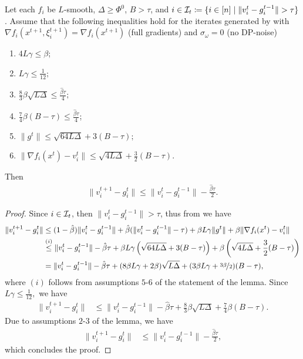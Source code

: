 \documentclass[a4paper,11pt]{article}
\begin{document}
\begin{lemma}\label{lem:bound_gt_vt}
    Let each $f_i$ be $L$-smooth, $\Delta \ge \Phi^0$, $B>\tau$, and $i \in \mathcal{I}_t \coloneqq \{i\in[n]\mid \|v_i^t - g_i^{t-1}\| > \tau\}$. Assume that the following inequalities hold for the iterates generated by  with $\nabla f_i(x^{t+1},\xi^{t+1}_i) = \nabla f_i(x^{t+1})$ (full gradients) and $\sigma_{\omega} = 0$ (no DP-noise)
    \begin{enumerate}
        \item $4L\gamma\le \beta$;
        \item $L\gamma \le \frac{1}{12};$
        \item $\frac{8}{3}\beta\sqrt{L\Delta} \le \frac{\hat{\beta}\tau}{4};$
        \item $\frac{7}{4}\beta(B-\tau) \le \frac{\hat{\beta}\tau}{4}$;
        \item $\|g^t\| \le \sqrt{64L\Delta} + 3(B-\tau);$
        \item $\|\nabla f_i(x^t) - v_i^t\| \le \sqrt{4L\Delta} + \frac{3}{2}(B-\tau).$
    \end{enumerate}
    Then 
    \begin{align}
        \|v_i^{t+1} - g_i^t\| \le \|v_i^t-g_i^{t-1}\| - \frac{\hat{\beta}\tau}{2}.
    \end{align}
\end{lemma}

\begin{proof}
Since $i\in\mathcal{I}_t$, then $\|v_i^t-g_i^{t-1}\| > \tau$, thus from  we have 
\begin{align*}
    \|v_i^{t+1} - g_i^t\| &\le 
    (1-\hat{\beta})\|v_i^t  - g_i^{t-1}\|
    +\hat{\beta}(\|v_i^t - g_i^{t-1}\| - \tau)
    + \beta L\gamma\|g^t\| 
    + \beta\|\nabla f_i(x^t) - v_i^t\|\\
    &\overset{(i)}{\le} \|v_i^t  - g_i^{t-1}\| -\hat{\beta} \tau 
    + \beta L\gamma\left(\sqrt{64L\Delta} + 3(B-\tau)\right)
    + \beta\left(\sqrt{4L\Delta} + \frac{3}{2}(B-\tau)\right)\\
    &= \|v_i^t  - g_i^{t-1}\| - \hat{\beta}\tau
    + (8\beta L\gamma + 2\beta)\sqrt{L\Delta}
    + (3\beta L\gamma + \nicefrac{3\beta}{2})(B-\tau),
\end{align*}
where $(i)$ follows from assumptions $5$-$6$ of the statement of the lemma. Since $L\gamma \le \frac{1}{12},$ we have
\begin{align*}
    \|v_i^{t+1} - g_i^t\| &\le \|v_i^t  - g_i^{t-1}\| 
    - \hat{\beta}\tau
    + \frac{8}{3}\beta\sqrt{L\Delta}
    + \frac{7}{4}\beta(B-\tau).
\end{align*}
Due to assumptions $2$-$3$ of the lemma, we have 
\begin{align*}
    \|v_i^{t+1} - g_i^t\| &\le \|v_i^t  - g_i^{t-1}\| - \frac{\hat{\beta}\tau}{2},
\end{align*}
which concludes the proof.
\end{proof}
\end{document}
